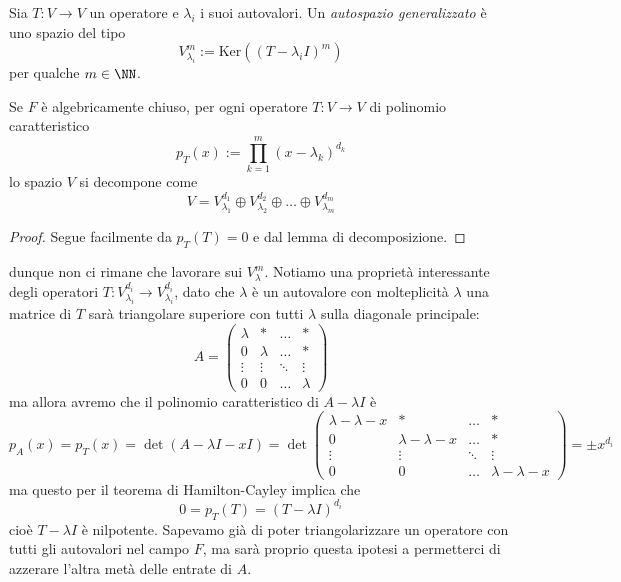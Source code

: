 \documentclass[11pt]{scrartcl}
\renewcommand{\ker}[1]{\text{Ker}\left(#1\right)}
\begin{document}
   	 \begin{definition}
   	 	Sia $T:V\to V$ un operatore e $\lambda_i$ i suoi autovalori. Un \textit{autospazio generalizzato} è uno spazio del tipo
   	 	$$V_{\lambda_i}^m:=\ker{\left(T-\lambda_iI\right)^m}$$
   	 	per qualche $m\in \NN$.
   	 \end{definition}
   	 \begin{corollary}
   	 	Se $F$ è algebricamente chiuso, per ogni operatore $T:V\to V$ di polinomio caratteristico
   	 	$$p_T(x):=\prod_{k=1}^{m}\left(x-\lambda_k\right)^{d_k}$$
   	 	lo spazio $V$ si decompone come
   	 	$$V=V_{\lambda_1}^{d_1}\oplus V_{\lambda_2}^{d_2}\oplus \dots \oplus V_{\lambda_m}^{d_m}$$
   	 \end{corollary}
   	 \begin{proof}
   	 	Segue facilmente da $p_T(T)=0$ e dal lemma di decomposizione.
   	 \end{proof}
   	 dunque non ci rimane che lavorare sui $V_\lambda^m$. Notiamo una proprietà interessante degli operatori $T:V_{\lambda_i}^{d_i}\to V_{\lambda_i}^{d_i}$, dato che $\lambda$ è un autovalore con molteplicità $\lambda$ una matrice di $T$ sarà triangolare superiore con tutti $\lambda$ sulla diagonale principale:
   	 $$A=
   	 \begin{pmatrix}
   	 	\lambda & * & \dots & * \\
   	 	0 & \lambda & \dots & * \\
   	 	\vdots & \vdots & \ddots & \vdots \\
   	 	0 & 0 & \dots & \lambda
   	 \end{pmatrix}
   	 $$
   	 ma allora avremo che il polinomio caratteristico di $A-\lambda I$ è
   	 $$
   	 p_A(x)=p_T(x)=\det\left(A-\lambda I-xI\right)=\det\begin{pmatrix}
   	 	\lambda-\lambda-x & * & \dots & * \\
   	 	0 & \lambda-\lambda-x & \dots & * \\
   	 	\vdots & \vdots & \ddots & \vdots \\
   	 	0 & 0 & \dots & \lambda-\lambda-x
   	 \end{pmatrix}=\pm x^{d_i}
   	 $$
   	 ma questo per il teorema di Hamilton-Cayley implica che 
   	 $$0=p_T(T)=(T-\lambda I)^{d_i}$$
   	 cioè $T-\lambda I$ è nilpotente. Sapevamo già di poter triangolarizzare un operatore con tutti gli autovalori nel campo $F$, ma sarà proprio questa ipotesi a permetterci di azzerare l'altra metà delle entrate di $A$.
\end{document}
